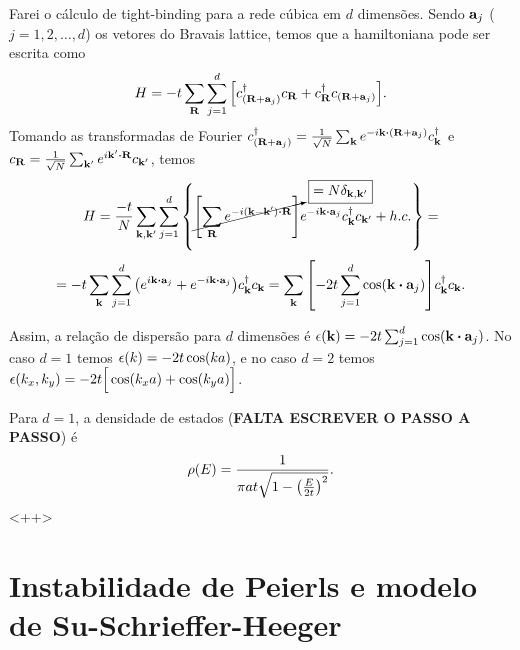 \documentclass[a4paper,10pt]{article}
\begin{document}
Farei o cálculo de tight-binding para a rede cúbica em $d$ dimensões. Sendo $\vb{a}_j$ ($j=1,2,\ldots,d$) os vetores do Bravais lattice, temos que a hamiltoniana pode ser escrita como
$$
H = -t \sum_{\vb{R}} \sum_{j=1}^{d}
\qty[ c_{(\vb{R}+\vb{a}_j)}^\dagger c_{\vb{R}} + c_{\vb{R}}^\dagger c_{(\vb{R}+\vb{a}_j)} ].
$$
Tomando as transformadas de Fourier $c_{(\R+\a_j)}^\d = \frac{1}{\sqrt{N}} \sum_{\k} e^{-i\k\vdot(\R+\a_j)} c_{\k}^\d$ e $c_{\R} = \frac{1}{\sqrt{N}} \sum_{\k'} e^{i\k'\vdot\R} c_{\k'}$, temos
$$
H = \frac{-t}{N} \sum_{\k,\k'} \sum_{j=1}^{d}
\qty{
\cancelto{\boxed{= N \delta_{\k, \k'}}}{\qty[\sum_{\R} e^{-i(\k-\k')\vdot\R}]}
e^{-i\k\vdot\a_j} c_{\k}^\d c_{\k'} + h.c.} =
$$
$$
= -t \sum_{\k} \sum_{j=1}^{d} \qty(e^{i\k\vdot\a_j} + e^{-i\k\vdot\a_j})
c_{\k}^\d c_{\k} =
\sum_{\k} \qty[- 2t \sum_{j=1}^{d} \cos(\k \vdot \a_j)] c_{\k}^\d c_{\k}.
$$

Assim, a relação de dispersão para $d$ dimensões é $\eps(\k) = -2t \sum_{j=1}^{d} \cos(\k \vdot \a_j)$. No caso $d=1$ temos $\epsilon(k) = -2t \cos(ka)$, e no caso $d = 2$ temos $\epsilon(k_x, k_y) = -2t \Big[\cos(k_x a) + \cos(k_y a) \Big]$.

Para $d = 1$, a densidade de estados (\textbf{FALTA ESCREVER O PASSO A PASSO}) é
$$
\rho(E) = \frac{1}{\pi a t \sqrt{1 - \qty(\frac{E}{2t})^2}}.
$$
<++>


\pagebreak

\section{Instabilidade de Peierls e modelo de Su-Schrieffer-Heeger}
\end{document}
